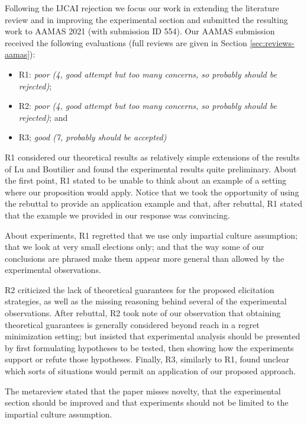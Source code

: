 \documentclass[version=3.21, pagesize, twoside=off, bibliography=totoc, DIV=calc, fontsize=12pt, a4paper]{scrartcl}
\begin{document}
\medskip
Following the IJCAI rejection we focus our work in extending the literature review and in improving the experimental section %
and submitted the resulting work to AAMAS 2021 (with submission ID 554). 
Our AAMAS submission received the following evaluations (full reviews are given in Section \ref{sec:reviews-aamas}):
\begin{itemize}
\item R1: {\em poor (4, good attempt but too many concerns, so probably should be rejected)};
\item R2: {\em poor (4, good attempt but too many concerns, so probably should be rejected)}; and
\item R3; {\em good (7, probably should be accepted)}
\end{itemize}
R1 considered our theoretical results as relatively simple extensions of the results of Lu and Boutilier and found the experimental results quite preliminary. About the first point, R1 stated to be unable to think about an example of a setting where our proposition would apply. 
Notice that we took the opportunity of using the rebuttal to provide an application example and that, after rebuttal, R1 stated that the example we provided in our response was convincing.

About experiments, R1 regretted that we use only impartial culture assumption; that we look at very small elections only; and that the way some of our conclusions are phrased make them appear more general than allowed by the experimental observations. 

R2 criticized the lack of theoretical guarantees for the proposed elicitation strategies, as well as the missing reasoning behind several of the experimental observations. After rebuttal, R2 took note of our observation that obtaining theoretical guarantees is generally considered beyond reach in a regret minimization setting; but insisted that experimental analysis should be presented by first formulating hypotheses to be tested, then showing how the experiments support or refute those hypotheses. Finally, R3, similarly to R1, found unclear which sorts of situations would permit an application of our proposed approach.

The metareview stated that the paper misses novelty, that the experimental section should be improved and that experiments should not be limited to the impartial culture assumption.
\end{document}
